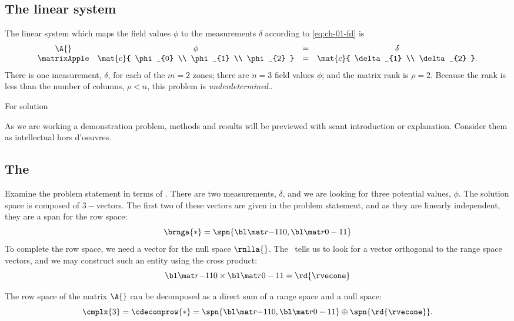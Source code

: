 \subsection{The linear system} 
The linear system which maps the field values $\phi$ to the measurements $\delta$ according to \eqref{eq:ch-01-fd} is
\begin{equation}
	\begin{array}{cccc}
		\A{} &\phi &= &\delta \\
		\matrixApple
		&\mat{c}{ \phi_{0} \\ \phi_{1} \\ \phi_{2} }
		& =
		&\mat{c}{ \delta_{1} \\ \delta_{2} } .
	\end{array}
\label{eq:01-zonal-example}
\end{equation}
%
There is one measurement, $\delta$, for each of the $m = 2$ zones; there are $n = 3$ field values $\phi$; and the matrix rank is $\rho = 2$. Because the rank is less than the number of columns, $\rho < n$, this problem is \emph{underdetermined}..

For solution

As we are working a demonstration problem, methods and results will be previewed with scant introduction or explanation. Consider them as intellectual hors d'oeuvres.

\subsection{The \ftola} 
Examine the problem statement in terms of \ftola. There are two measurements, $\delta$, and we are looking for three potential values, $\phi$. The solution space is composed of $3-$vectors. The first two of these vectors are given in the problem statement, and as they are linearly independent, they are a span for the row space:
%
\begin{equation}
	\brnga{*} = \spn{ \argon, \boron }
\label{eq:ch-01-least-squares-span}
\end{equation}
%
To complete the row space, we need a vector for the null space $\rnlla{}$. The \ft \ tells us to look for a vector orthogonal to the range space vectors, and we may construct such an entity using the cross product:
%
\begin{equation}
	 \argon \times  \boron = \rd{\rvecone}
\end{equation}

The row space of the matrix $\A{}$ can be decomposed as a direct sum of a range space and a null space:
\begin{equation}
	\cmplx{3} =  \cdecomprow{*} = \spn{\argon, \boron} \oplus \spn{\rd{\rvecone}}.
\label{eq:ch-01:subspace decomposition}
\end{equation}


